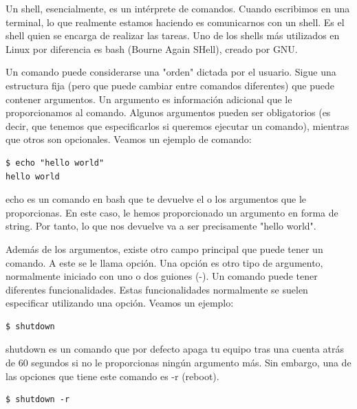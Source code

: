 Un shell, esencialmente, es un intérprete de comandos. Cuando escribimos en una terminal, lo que realmente estamos haciendo es comunicarnos con un shell. Es el shell quien se encarga de realizar las tareas. Uno de los shells más utilizados en Linux por diferencia es bash (Bourne Again SHell), creado por GNU.

Un comando puede considerarse una "orden" dictada por el usuario. Sigue una estructura fija (pero que puede cambiar entre comandos diferentes) que puede contener argumentos. Un argumento es información adicional que le proporcionamos al comando. Algunos argumentos pueden ser obligatorios (es decir, que tenemos que especificarlos si queremos ejecutar un comando), mientras que otros son opcionales. Veamos un ejemplo de comando:

\begin{tcolorbox-code}
\begin{lstlisting}
$ echo "hello world"
hello world
\end{lstlisting}
\end{tcolorbox-code}

echo es un comando en bash que te devuelve el o los argumentos que le proporcionas. En este caso, le hemos proporcionado un argumento en forma de string. Por tanto, lo que nos devuelve va a ser precisamente "hello world".


Además de los argumentos, existe otro campo principal que puede tener un comando. A este se le llama opción. Una opción es otro tipo de argumento, normalmente iniciado con uno o dos guiones (-). Un comando puede tener diferentes funcionalidades. Estas funcionalidades normalmente se suelen especificar utilizando una opción. Veamos un ejemplo:

\begin{tcolorbox-code}
\begin{lstlisting}
$ shutdown
\end{lstlisting}
\end{tcolorbox-code}

shutdown es un comando que por defecto apaga tu equipo tras una cuenta atrás de 60 segundos si no le proporcionas ningún argumento más. Sin embargo, una de las opciones que tiene este comando es -r (reboot).

\begin{tcolorbox-code}
\begin{lstlisting}
$ shutdown -r
\end{lstlisting}
\end{tcolorbox-code}

